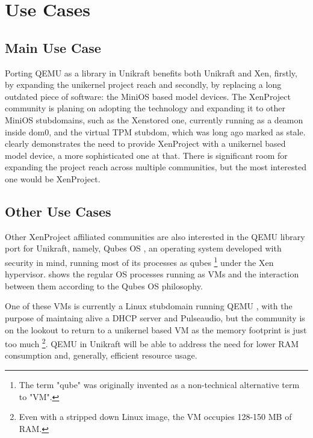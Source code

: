 \chapter{Use Cases}
\label{chapter:use-cases}

\section{Main Use Case}
\label{sec:main-use-case}

Porting QEMU as a library in Unikraft benefits both Unikraft and Xen, firstly, by expanding the unikernel project reach and secondly, by replacing a long outdated piece of software: the MiniOS based model devices.
The XenProject community is planing on adopting the technology and expanding it to other MiniOS stubdomains, such as the Xenstored one, currently running as a deamon inside dom0, and the virtual TPM stubdom, which was long ago marked as stale.
 clearly demonstrates the need to provide XenProject with a unikernel based model device, a more sophisticated one at that.
There is significant room for expanding the project reach across multiple communities, but the most interested one would be XenProject.


\section{Other Use Cases}
\label{sec:other-use-cases}

Other XenProject affiliated communities are also interested in the QEMU library port for Unikraft, namely, Qubes OS \cite{qubes-os}, an operating system developed with security in mind, running most of its processes as qubes \footnote{The term "qube" was originally invented as a non-technical alternative term to "VM".} under the Xen hypervisor.
 shows the regular OS processes running as VMs and the interaction between them according to the Qubes OS philosophy.


One of these VMs is currently a Linux stubdomain running QEMU \cite{qubes-os-linux-stubdom}, with the purpose of maintaing alive a DHCP server and Pulseaudio, but the community is on the lookout to return to a unikernel based VM as the memory footprint is just too much \footnote{Even with a stripped down Linux image, the VM occupies 128-150 MB of RAM.}.
QEMU in Unikraft will be able to address the need for lower RAM consumption and, generally, efficient resource usage.
